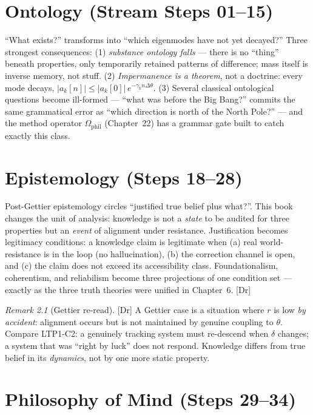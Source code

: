 \documentclass[11pt,a4paper,twoside]{book}
\newcommand{\tier}[1]{\textnormal{\small\textsf{[#1]}}}
\newcommand{\Dr}{\tier{Dr}}\newcommand{\Cj}{\tier{Cj}}\newcommand{\Wf}{\tier{Wf}}
\theoremstyle{plain}
\theoremstyle{definition}
\theoremstyle{remark}
\newtheorem{remark}[theorem]{Remark}
\begin{document}
\chapter{Ontology (Stream Steps 01--15)}

``What exists?'' transforms into ``which eigenmodes have not yet decayed?''
Three strongest consequences: (1) \emph{substance ontology falls} --- there
is no ``thing'' beneath properties, only temporarily retained patterns of
difference; mass itself is inverse memory, not stuff. (2) \emph{Impermanence
is a theorem}, not a doctrine: every mode decays,
$|a_k[n]| \le |a_k[0]|\,e^{-\gamma_k n\Delta\theta}$. (3) Several classical
ontological questions become ill-formed --- ``what was before the Big Bang?''
commits the same grammatical error as ``which direction is north of the North
Pole?'' --- and the method operator $\Omega_{\mathrm{phil}}$ (Chapter~22) has
a grammar gate built to catch exactly this class.

\chapter{Epistemology (Steps 18--28)}

Post-Gettier epistemology circles ``justified true belief plus what?''. This
book changes the unit of analysis: knowledge is not a \emph{state} to be
audited for three properties but an \emph{event} of alignment under
resistance. Justification becomes legitimacy conditions: a knowledge claim is
legitimate when (a) real world-resistance is in the loop (no hallucination),
(b) the correction channel is open, and (c) the claim does not exceed its
accessibility class. Foundationalism, coherentism, and reliabilism become
three projections of one condition set --- exactly as the three truth
theories were unified in Chapter~6. \Dr

\begin{remark}[Gettier re-read]\Dr
A Gettier case is a situation where $r$ is low \emph{by accident}: alignment
occurs but is not maintained by genuine coupling to $\theta$. Compare
LTP1-C2: a genuinely tracking system must re-descend when $\delta$ changes; a
system that was ``right by luck'' does not respond. Knowledge differs from
true belief in its \emph{dynamics}, not by one more static property.
\end{remark}

\chapter{Philosophy of Mind (Steps 29--34)}
\end{document}
